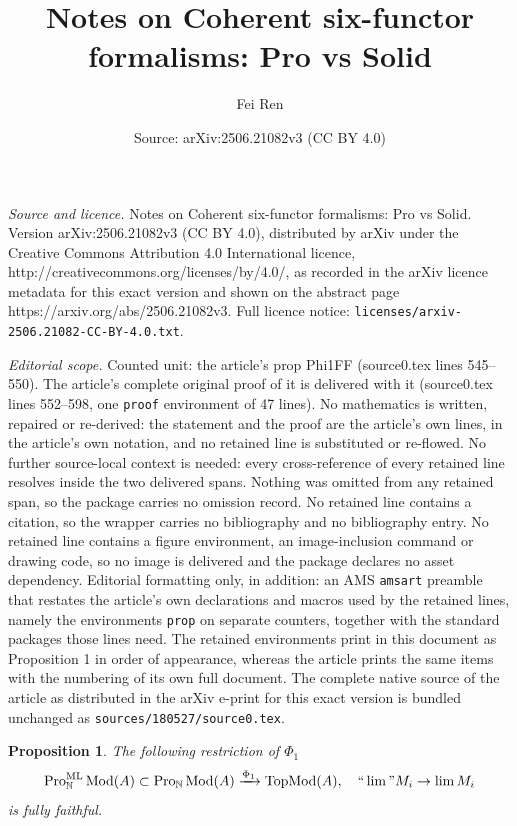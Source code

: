 \documentclass[10pt,a4paper]{amsart}
\title{Notes on Coherent six-functor formalisms: Pro vs Solid}
\author{Fei Ren}
\date{Source: arXiv:2506.21082v3 (CC BY 4.0)}
\newtheorem{prop}{Proposition}
\newcommand{\ML}{\operatorname{ML}}
\newcommand{\Mod}{\operatorname{Mod}}
\newcommand{\N}{\mathbb{N}}
\newcommand{\Pro}{\operatorname{Pro}}
\newcommand{\TopMod}{\operatorname{TopMod}}
\newcommand{\eq}[2]{\begin{equation}\label{#1}#2 \end{equation}}
\renewcommand{\lim}{\operatornamewithlimits{\rm{lim}}}
\newcommand{\ra}{\rightarrow} %
\newcommand{\xra}{\xrightarrow}
\begin{document}
\maketitle

\noindent\emph{Source and licence.} Notes on Coherent six-functor formalisms: Pro vs Solid. Version arXiv:2506.21082v3 (CC BY 4.0), distributed by arXiv under the Creative Commons Attribution 4.0 International licence, http://creativecommons.org/licenses/by/4.0/, as recorded in the arXiv licence metadata for this exact version and shown on the abstract page https://arxiv.org/abs/2506.21082v3. Full licence notice: \texttt{licenses/arxiv-2506.21082-CC-BY-4.0.txt}.\par\smallskip

\noindent\textit{Editorial scope.} Counted unit: the article's prop Phi1FF (source0.tex lines 545--550). The article's complete original proof of it is delivered with it (source0.tex lines 552--598, one \texttt{proof} environment of 47 lines). No mathematics is written, repaired or re-derived: the statement and the proof are the article's own lines, in the article's own notation, and no retained line is substituted or re-flowed.  No further source-local context is needed: every cross-reference of every retained line resolves inside the two delivered spans.  Nothing was omitted from any retained span, so the package carries no omission record.  No retained line contains a citation, so the wrapper carries no bibliography and no bibliography entry.  No retained line contains a figure environment, an image-inclusion command or drawing code, so no image is delivered and the package declares no asset dependency.  Editorial formatting only, in addition: an AMS \texttt{amsart} preamble that restates the article's own declarations and macros used by the retained lines, namely the environments \texttt{prop} on separate counters, together with the standard packages those lines need.  The retained environments print in this document as Proposition 1 in order of appearance, whereas the article prints the same items with the numbering of its own full document.  The complete native source of the article as distributed in the arXiv e-print for this exact version is bundled unchanged as \texttt{sources/180527/source0.tex}.
\begin{prop}\label{Phi1FF}
The following restriction of $\Phi_1$
\eq{{Phi1ML}}{
\Pro^{\ML}_{\N}\Mod(A)\subset \Pro_\N\Mod(A)\xra{\Phi_1} \TopMod(A),\quad``\lim " M_i\ra \lim M_i}
is fully faithful.
\end{prop}
\end{document}
